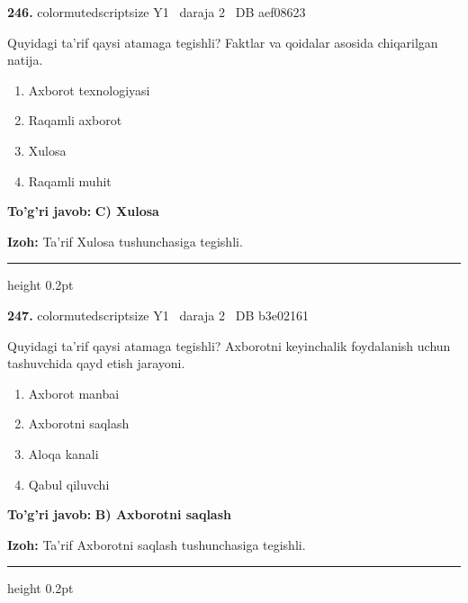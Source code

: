 \documentclass[10pt,a4paper,oneside]{article}
\begin{document}
\noindent\textbf{\color{ink}246.}  {color{muted}scriptsize Y1 \textbullet\ daraja 2 \textbullet\ DB aef08623}
\par
Quyidagi ta'rif qaysi atamaga tegishli? Faktlar va qoidalar asosida chiqarilgan natija.
\begin{enumerate}[label=\Alph*),leftmargin=9mm]
\item Axborot texnologiyasi
\item Raqamli axborot
\item Xulosa
\item Raqamli muhit
\end{enumerate}
\begin{tcolorbox}[enhanced,breakable,colback=teal!4,colframe=teal!50!black,boxrule=0.5pt,arc=1.1mm,left=3mm,right=3mm,top=1.7mm,bottom=1.7mm,before skip=2mm,after skip=2mm]
\textbf{\color{teal}To'g'ri javob:} \textbf{C) Xulosa}
\par\smallskip
\textbf{Izoh:} Ta'rif Xulosa tushunchasiga tegishli.
\end{tcolorbox}
\vspace{2mm}\hrule height 0.2pt \vspace{3mm}

\noindent\textbf{\color{ink}247.}  {color{muted}scriptsize Y1 \textbullet\ daraja 2 \textbullet\ DB b3e02161}
\par
Quyidagi ta'rif qaysi atamaga tegishli? Axborotni keyinchalik foydalanish uchun tashuvchida qayd etish jarayoni.
\begin{enumerate}[label=\Alph*),leftmargin=9mm]
\item Axborot manbai
\item Axborotni saqlash
\item Aloqa kanali
\item Qabul qiluvchi
\end{enumerate}
\begin{tcolorbox}[enhanced,breakable,colback=teal!4,colframe=teal!50!black,boxrule=0.5pt,arc=1.1mm,left=3mm,right=3mm,top=1.7mm,bottom=1.7mm,before skip=2mm,after skip=2mm]
\textbf{\color{teal}To'g'ri javob:} \textbf{B) Axborotni saqlash}
\par\smallskip
\textbf{Izoh:} Ta'rif Axborotni saqlash tushunchasiga tegishli.
\end{tcolorbox}
\vspace{2mm}\hrule height 0.2pt \vspace{3mm}
\end{document}
